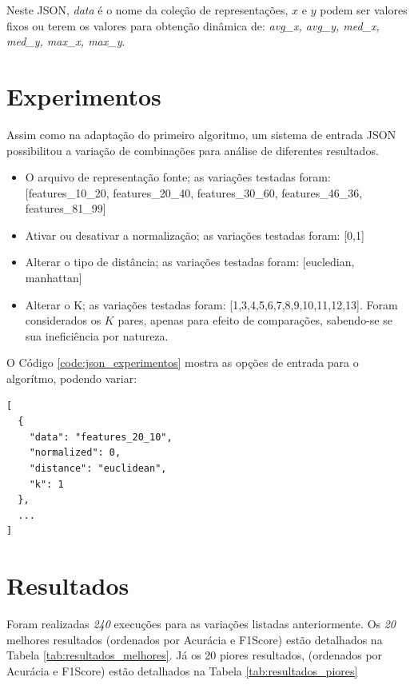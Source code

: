 \documentclass[12pt]{article}
\begin{document}
Neste JSON, \textit{data} é o nome da coleção de representações, $x$ e $y$ podem ser valores fixos ou terem os valores para obtenção dinâmica de: \textit{avg\_x, avg\_y, med\_x, med\_y, max\_x, max\_y}.

\section{Experimentos}

Assim como na adaptação do primeiro algoritmo, um sistema de entrada JSON possibilitou a variação de combinações para análise de diferentes resultados.

\begin{itemize}
  \item O arquivo de representação fonte; as variações testadas foram: [features\_10\_20, features\_20\_40, features\_30\_60, features\_46\_36, features\_81\_99]
  \item Ativar ou desativar a normalização; as variações testadas foram: [0,1]
  \item Alterar o tipo de distância; as variações testadas foram: [eucledian, manhattan]
  \item Alterar o K; as variações testadas foram: [1,3,4,5,6,7,8,9,10,11,12,13]. Foram considerados os $K$ pares, apenas para efeito de comparações, sabendo-se se sua ineficiência por natureza.
\end{itemize}

\newpage

O Código \ref{code:json_experimentos} mostra as opções de entrada para o algorítmo, podendo variar:

\begin{lstlisting}[caption={JSON para experimentos},captionpos=b,frame=single,label={code:json_experimentos}]
[
  {
    "data": "features_20_10",
    "normalized": 0,
    "distance": "euclidean",
    "k": 1
  },
  ...
]
\end{lstlisting}

\section{Resultados}

Foram realizadas \textit{240} execuções para as variações listadas anteriormente. Os \textit{20} melhores resultados (ordenados por Acurácia e F1Score) estão detalhados na Tabela \ref{tab:resultados_melhores}. Já os 20 piores resultados,  (ordenados por Acurácia e F1Score) estão detalhados na Tabela \ref{tab:resultados_piores}
\end{document}
